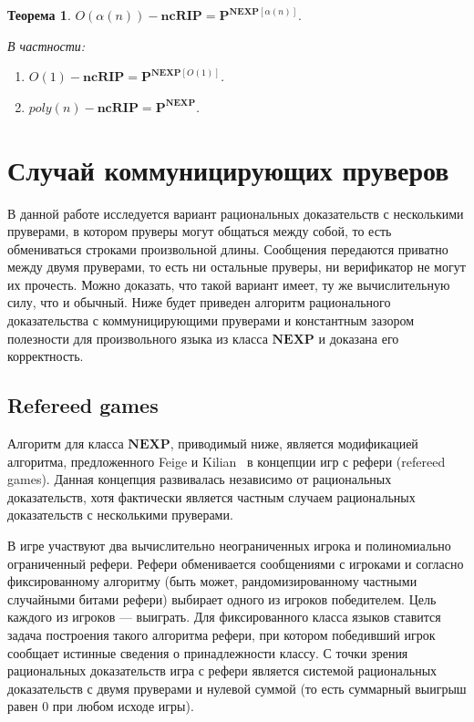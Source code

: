 \documentclass[14pt, a4paper]{extreport}
\newtheorem{theorem}{\indent Теорема}
\begin{document}
        \begin{theorem}
            $O(\alpha(n))-\textbf{ncRIP} = \textbf{P}^{\textbf{NEXP}\left[\alpha(n)\right]}.$

            В частности:
            \begin{enumerate}
                \item $ O(1)-\textbf{ncRIP} = {\textbf{P}}^{\textbf{NEXP}[O(1)] }$.
                \item $\textit{poly}(n)-\textbf{ncRIP} = \textbf{P}^{\textbf{NEXP}}$.
            \end{enumerate}
        \end{theorem}


        \chapter{Случай коммуницирующих пруверов}

        В данной работе исследуется вариант рациональных доказательств с несколькими пруверами, в котором пруверы могут общаться между собой, то есть обмениваться строками произвольной длины. Сообщения передаются приватно между двумя пруверами, то есть ни остальные пруверы, ни верификатор не могут их прочесть. Можно доказать, что такой вариант имеет, ту же вычислительную силу, что и обычный. Ниже будет приведен алгоритм рационального доказательства с коммуницирующими пруверами и константным зазором полезности для произвольного языка из класса $\textbf{NEXP}$ и доказана его корректность.

        \section{Refereed games}
        Алгоритм для класса $\textbf{NEXP}$, приводимый ниже, является модификацией алгоритма, предложенного Feige и Kilian~\cite{feige1997refereed} в концепции игр с рефери (refereed games). Данная концепция развивалась независимо от рациональных доказательств, хотя фактически является частным случаем рациональных доказательств с несколькими пруверами.

        В игре участвуют два вычислительно неограниченных игрока и полиномиально ограниченный рефери. Рефери обменивается сообщениями с игроками и согласно фиксированному алгоритму (быть может, рандомизированному частными случайными битами рефери) выбирает одного из игроков победителем. Цель каждого из игроков --- выиграть. Для фиксированного класса языков ставится задача построения такого алгоритма рефери, при котором победивший игрок сообщает истинные сведения о принадлежности классу. С точки зрения рациональных доказательств игра с рефери является системой рациональных доказательств с двумя пруверами и нулевой суммой (то есть суммарный выигрыш равен $0$ при любом исходе игры).
\end{document}
